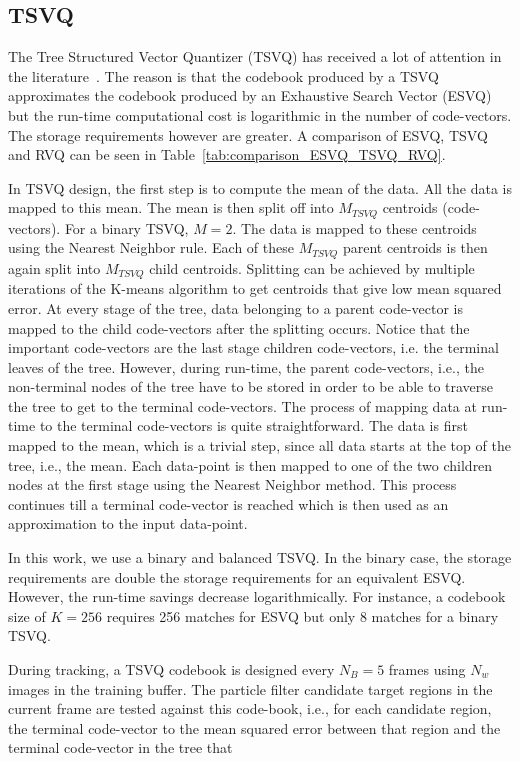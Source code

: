\begin{Body}
\subsection{TSVQ}
The Tree Structured Vector Quantizer (TSVQ) has received a lot of attention in the literature~\cite{1991_BOOK_VQ_GershoGray}.  The reason is that the codebook produced by a TSVQ approximates the codebook produced by an Exhaustive Search Vector (ESVQ) but the run-time computational cost is logarithmic in the number of code-vectors.  The storage requirements however are greater.  A comparison of ESVQ, TSVQ and RVQ can be seen in Table~\ref{tab:comparison_ESVQ_TSVQ_RVQ}.

In TSVQ design, the first step is to compute the mean of the data.  All the data is mapped to this mean.  The mean is then split off into $M_{TSVQ}$ centroids (code-vectors).  For a binary TSVQ, $M=2$.  The data is mapped to these centroids using the Nearest Neighbor rule.  Each of these $M_{TSVQ}$ parent centroids is then again split into $M_{TSVQ}$ child centroids.  Splitting can be achieved by multiple iterations of the K-means algorithm to get centroids that give low mean squared error.  At every stage of the tree, data belonging to a parent code-vector is mapped to the child code-vectors after the splitting occurs.  Notice that the important code-vectors are the last stage children code-vectors, i.e. the terminal leaves of the tree.  However, during run-time, the parent code-vectors, i.e., the non-terminal nodes of the tree have to be stored in order to be able to traverse the tree to get to the terminal code-vectors.  The process of mapping data at run-time to the terminal code-vectors is quite straightforward.  The data is first mapped to the mean, which is a trivial step, since all data starts at the top of the tree, i.e., the mean.  Each data-point is then mapped to one of the two children nodes at the first stage using the Nearest Neighbor method.  This process continues till a terminal code-vector is reached which is then used as an approximation to the input data-point.

In this work, we use a binary and balanced TSVQ.  In the binary case, the storage requirements are double the storage requirements for an equivalent ESVQ.  However, the run-time savings decrease logarithmically.  For instance, a codebook size of $K=256$ requires 256 matches for ESVQ but only 8 matches for a binary TSVQ.  

During tracking, a TSVQ codebook is designed every $N_B=5$ frames using $N_w$ images in the training buffer.  The particle filter candidate target regions in the current frame are tested against this code-book, i.e., for each candidate region, the terminal code-vector  to the mean squared error between that region and the terminal code-vector in the tree that 



\end{Body}
